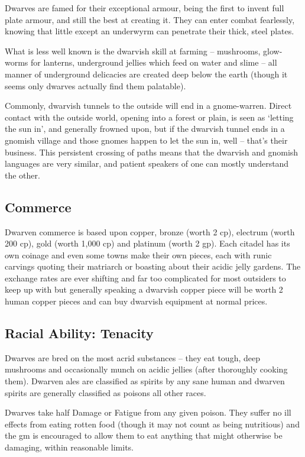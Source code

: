 \begin{multicols}{2}
Dwarves are famed for their exceptional armour, being the first to invent full plate armour, and still the best at creating it. They can enter combat fearlessly, knowing that little except an underwyrm can penetrate their thick, steel plates.

What is less well known is the dwarvish skill at farming -- mushrooms, glow-worms for lanterns, underground jellies which feed on water and slime -- all manner of underground delicacies are created deep below the earth (though it seems only dwarves actually find them palatable).

Commonly, dwarvish tunnels to the outside will end in a gnome-warren. Direct contact with the outside world, opening into a forest or plain, is seen as `letting the sun in', and generally frowned upon, but if the dwarvish tunnel ends in a gnomish village and those gnomes happen to let the sun in, well -- that's their business.
This persistent crossing of paths means that the dwarvish and gnomish languages are very similar, and patient speakers of one can mostly understand the other.

\subsection{Commerce}

Dwarven commerce is based upon copper, bronze (worth 2 cp), electrum (worth 200 cp), gold (worth 1,000 cp) and platinum (worth 2 gp). Each citadel has its own coinage and even some towns make their own pieces, each with runic carvings quoting their matriarch or boasting about their acidic jelly gardens. The exchange rates are ever shifting and far too complicated for most outsiders to keep up with but generally speaking a dwarvish copper piece will be worth 2 human copper pieces and can buy dwarvish equipment at normal prices.

\subsection{Racial Ability: Tenacity}

Dwarves are bred on the most acrid substances -- they eat tough, deep mushrooms and occasionally munch on acidic jellies (after thoroughly cooking them).
Dwarven ales are classified as spirits by any sane human and dwarven spirits are generally classified as poisons all other races.

Dwarves take half Damage or Fatigue from any given poison. They suffer no ill effects from eating rotten food (though it may not count as being nutritious) and the \gls{gm} is encouraged to allow them to eat anything that might otherwise be damaging, within reasonable limits.


\end{multicols}
